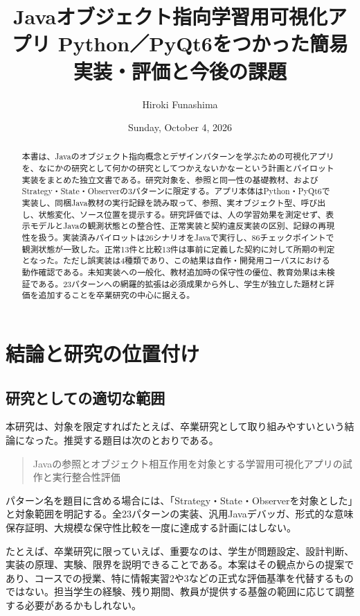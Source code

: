 \documentclass[a4paper,11pt]{ltjsarticle}
\title{Javaオブジェクト指向学習用可視化アプリ\newline
\large Python／PyQt6をつかった簡易実装・評価と今後の課題}
\author{Hiroki Funashima}
\date{Sunday, October 4, 2026}
\begin{document}
\maketitle
\begin{abstract}
本書は、Javaのオブジェクト指向概念とデザインパターンを学ぶための可視化アプリを、なにかの研究として何かの研究としてつかえないかなーという計画とパイロット実装をまとめた独立文書である。研究対象を、参照と同一性の基礎教材、およびStrategy・State・Observerの3パターンに限定する。アプリ本体はPython・PyQt6で実装し、同梱Java教材の実行記録を読み取って、参照、実オブジェクト型、呼び出し、状態変化、ソース位置を提示する。研究評価では、人の学習効果を測定せず、表示モデルとJavaの観測状態との整合性、正常実装と契約違反実装の区別、記録の再現性を扱う。実装済みパイロットは26シナリオをJavaで実行し、86チェックポイントで観測状態が一致した。正常13件と比較13件は事前に定義した契約に対して所期の判定となった。ただし誤実装は4種類であり、この結果は自作・開発用コーパスにおける動作確認である。未知実装への一般化、教材追加時の保守性の優位、教育効果は未検証である。23パターンへの網羅的拡張は必須成果から外し、学生が独立した題材と評価を追加することを卒業研究の中心に据える。
\end{abstract}
\clearpage
\setcounter{tocdepth}{1}
\tableofcontents
\clearpage

\section{結論と研究の位置付け}
\subsection{研究としての適切な範囲}
本研究は、対象を限定すればたとえば、卒業研究として取り組みやすいという結論になった。推奨する題目は次のとおりである。
\begin{quote}
Javaの参照とオブジェクト相互作用を対象とする学習用可視化アプリの試作と実行整合性評価
\end{quote}
パターン名を題目に含める場合には、「Strategy・State・Observerを対象とした」と対象範囲を明記する。全23パターンの実装、汎用Javaデバッガ、形式的な意味保存証明、大規模な保守性比較を一度に達成する計画にはしない。

たとえば、卒業研究に限っていえば、重要なのは、学生が問題設定、設計判断、実装の原理、実験、限界を説明できることである。本案はその観点からの提案であり、コースでの授業、特に情報実習2や3などの正式な評価基準を代替するものではない。担当学生の経験、残り期間、教員が提供する基盤の範囲に応じて調整する必要があるかもしれない。
\end{document}
